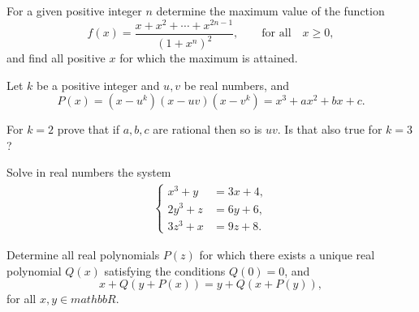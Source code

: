 \documentclass[12pt,a4paper]{memoir}
\theoremstyle{definition}
\begin{document}
\begin{question}[name={1991 Austrian--Polish}]
	For a given positive integer $n$ determine the maximum value of the function \[f (x) = \frac{x + x^2 +\cdots+ x^{2n-1}}{(1 + x^n)^2}, \qquad \text{for all} \quad x \geq 0,\] and find all positive $x$ for which the maximum is attained.
\end{question}




\begin{question}[name={1992 Austrian--Polish}]
	Let $k$ be a positive integer and $u, v$ be real numbers, and \[P(x) = (x - u^k) (x - uv) (x -v^k) = x^3 + ax^2 + bx + c.\]
	\begin{tasks}
		\task For $k = 2$ prove that if $a, b, c$ are rational then so is $uv$.
		\task Is that also true for $k = 3$?
	\end{tasks}
\end{question}




\begin{question}[name={1993 Austrian--Polish}]
	Solve in real numbers the system
	\begin{align*}
		\begin{cases}
			x^3 + y  &= 3x + 4,\\
			2y^3 + z &= 6y + 6,\\
			3z^3 + x &= 9z + 8.
		\end{cases}
	\end{align*}
\end{question}




\begin{question}[name={1993 Austrian--Polish}]
	Determine all real polynomials $P(z)$ for which there exists a unique real polynomial $Q(x)$ satisfying the conditions $Q(0)= 0$, and \[x + Q(y + P(x))= y + Q(x + P(y)),\] for all $x,y \in mathbb R$.
\end{question}
\end{document}
